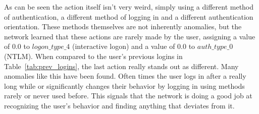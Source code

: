 As can be seen the action itself isn't very weird, simply using a different method of authentication, a different method of logging in and a different authentication orientation. These methods themselves are not inherently anomalies, but the network learned that these actions are rarely made by the user, assigning a value of 0.0 to \(logon\_type\_4\) (interactive logon) and a value of 0.0 to \(auth\_type\_0\) (NTLM). When compared to the user's previous logins in Table~\ref{tab:prev_logins}, the last action really stands out as different. Many anomalies like this have been found. Often times the user logs in after a really long while or significantly changes their behavior by logging in using methods rarely or never used before. This signals that the network is doing a good job at recognizing the user's behavior and finding anything that deviates from it.